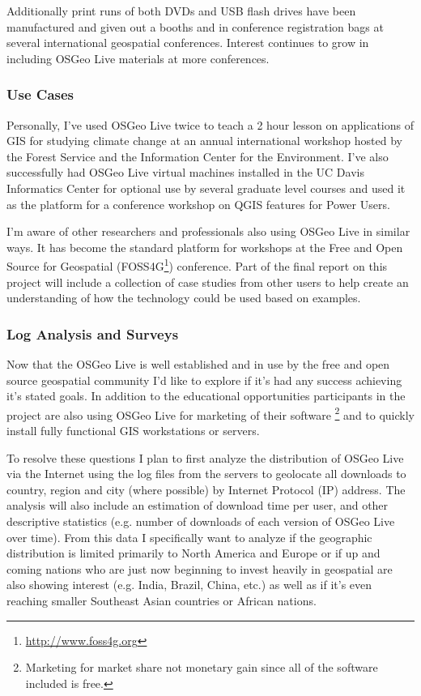 \documentclass[12pt,letterpaper]{article}
\begin{document}
Additionally print runs of both DVDs and USB flash drives have been manufactured and given out a booths and in conference registration bags at several international geospatial conferences. Interest continues to grow in including OSGeo Live materials at more conferences.

\subsubsection{Use Cases}
Personally, I've used OSGeo Live twice to teach a 2 hour lesson on applications of GIS for studying climate change at an annual international workshop hosted by the Forest Service and the Information Center for the Environment. I've also successfully had OSGeo Live virtual machines installed in the UC Davis Informatics Center for optional use by several graduate level courses and used it as the platform for a conference workshop on QGIS features for Power Users.

I'm aware of other researchers and professionals also using OSGeo Live in similar ways. It has become the standard platform for workshops at the Free and Open Source for Geospatial (FOSS4G\footnote{\url{http://www.foss4g.org}}) conference.  Part of the final report on this project will include a collection of  case studies from other users to help create an understanding of how the technology could be used based on examples. 

\subsubsection{Log Analysis and Surveys}
Now that the OSGeo Live is well established and in use by the free and open source geospatial community I'd like to explore if it's had any success achieving it's stated goals. In addition to the educational opportunities participants in the project are also using OSGeo Live for marketing of their software \footnote{Marketing for market share not monetary gain since all of the software included is free.} and to quickly install fully functional GIS workstations or servers.

To resolve these questions I plan to first analyze the distribution of OSGeo Live via the Internet using the log files from the servers to geolocate all downloads to country, region and city (where possible) by Internet Protocol (IP) address. The analysis will also include an estimation of download time per user, and other descriptive statistics (e.g. number of downloads of each version of OSGeo Live over time). From this data I specifically want to analyze if the geographic distribution is limited primarily to North America and Europe or if up and coming nations who are just now beginning to invest heavily in geospatial are also showing interest (e.g. India, Brazil, China, etc.) as well as if it's even reaching smaller Southeast Asian countries or African nations.
 
\end{document}
